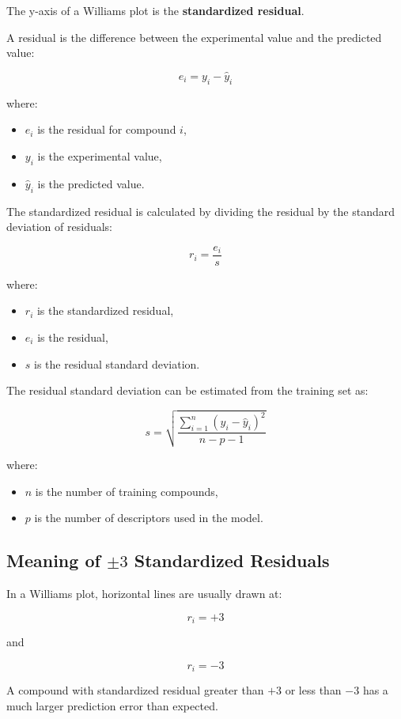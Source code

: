\documentclass[11pt]{report}
\newenvironment{Important note}{\begin{quote}\color{red}\textbf{Important note:} }{\end{quote}}
\begin{document}
The y-axis of a Williams plot is the \textbf{standardized residual}.

A residual is the difference between the experimental value and the predicted value:

\[
e_i = y_i - \hat{y}_i
\]

where:

\begin{itemize}[leftmargin=*]
    \item $e_i$ is the residual for compound $i$,
    \item $y_i$ is the experimental value,
    \item $\hat{y}_i$ is the predicted value.
\end{itemize}

The standardized residual is calculated by dividing the residual by the standard deviation of residuals:

\[
r_i = \frac{e_i}{s}
\]

where:

\begin{itemize}[leftmargin=*]
    \item $r_i$ is the standardized residual,
    \item $e_i$ is the residual,
    \item $s$ is the residual standard deviation.
\end{itemize}

The residual standard deviation can be estimated from the training set as:

\[
s = \sqrt{\frac{\sum_{i=1}^{n}(y_i - \hat{y}_i)^2}{n-p-1}}
\]

where:

\begin{itemize}[leftmargin=*]
    \item $n$ is the number of training compounds,
    \item $p$ is the number of descriptors used in the model.
\end{itemize}

\subsection{Meaning of $\pm 3$ Standardized Residuals}

In a Williams plot, horizontal lines are usually drawn at:

\[
r_i = +3
\]

and

\[
r_i = -3
\]

A compound with standardized residual greater than $+3$ or less than $-3$ has a much larger prediction error than expected.
\end{document}
